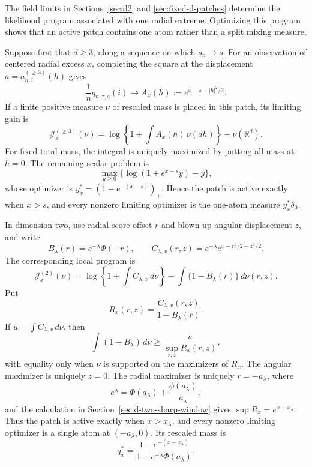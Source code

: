 The field limits in Sections~\ref{sec:d2} and
\ref{sec:fixed-d-patches} determine the likelihood program associated with one
radial extreme. Optimizing this program shows that an active patch contains one
atom rather than a split mixing measure.

Suppose first that \(d\ge3\), along a sequence on which \(s_n\to s\). For an
observation of centered radial excess \(x\), completing the square at the
displacement \(a=a_{n,i}^{(\ge3)}(h)\) gives
\[
    \frac1nq_{n,\tau,a}(i)\longrightarrow
    A_x(h):=e^{x-s-|h|^2/2}.
\]
If a finite positive measure \(\nu\) of rescaled mass is placed in this
patch, its limiting gain is
\begin{equation}
\label{eq:support-dge3-local-program}
    \mathcal J_x^{(\ge3)}(\nu)
    =\log\left\{1+\int A_x(h)\,\nu(dh)\right\}
      -\nu(\mathbb R^d).
\end{equation}
For fixed total mass, the integral is uniquely maximized by putting all mass
at \(h=0\). The remaining scalar problem is
\[
    \max_{y\ge0}\{\log(1+e^{x-s}y)-y\},
\]
whose optimizer is \(y_x^*=(1-e^{-(x-s)})_+\). Hence the patch is active
exactly when \(x>s\), and every nonzero limiting optimizer is the one-atom
measure \(y_x^*\delta_0\).

In dimension two, use radial score offset \(r\) and blown-up angular
displacement \(z\), and write
\[
    B_\lambda(r)=e^{-\lambda}\Phi(-r),
    \qquad
    C_{\lambda,x}(r,z)=e^{-\lambda}e^{x-r^2/2-z^2/2}.
\]
The corresponding local program is
\begin{equation}
\label{eq:support-d2-local-program}
    \mathcal J_x^{(2)}(\nu)
    =\log\left\{1+\int C_{\lambda,x}\,d\nu\right\}
      -\int\{1-B_\lambda(r)\}\,d\nu(r,z).
\end{equation}
Put
\[
    R_x(r,z)=\frac{C_{\lambda,x}(r,z)}{1-B_\lambda(r)}.
\]
If \(u=\int C_{\lambda,x}\,d\nu\), then
\[
    \int(1-B_\lambda)\,d\nu\ge
    \frac{u}{\sup_{r,z}R_x(r,z)},
\]
with equality only when \(\nu\) is supported on the maximizers of \(R_x\).
The angular maximizer is uniquely \(z=0\). The radial maximizer is uniquely
\(r=-a_\lambda\), where
\[
    e^\lambda=\Phi(a_\lambda)+\frac{\phi(a_\lambda)}{a_\lambda},
\]
and the calculation in Section~\ref{sec:d-two-sharp-window} gives
\(\sup R_x=e^{x-x_\lambda}\). Thus the patch is active exactly when
\(x>x_\lambda\), and every nonzero limiting optimizer is a single atom at
\((-a_\lambda,0)\). Its rescaled mass is
\[
    q_x^*=
    \frac{1-e^{-(x-x_\lambda)}}
         {1-e^{-\lambda}\Phi(a_\lambda)}.
\]

